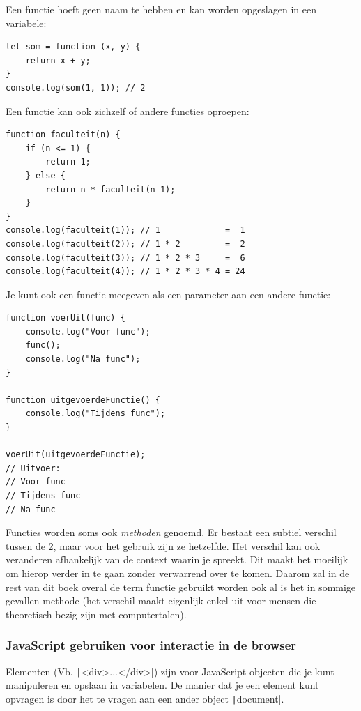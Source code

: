 Een functie hoeft geen naam te hebben en kan worden opgeslagen in een variabele:
\begin{verbatim}
let som = function (x, y) {
    return x + y;
}
console.log(som(1, 1)); // 2
\end{verbatim}

Een functie kan ook zichzelf of andere functies oproepen:
\begin{verbatim}
function faculteit(n) {
    if (n <= 1) {
        return 1;
    } else {
        return n * faculteit(n-1);
    }
}
console.log(faculteit(1)); // 1             =  1
console.log(faculteit(2)); // 1 * 2         =  2
console.log(faculteit(3)); // 1 * 2 * 3     =  6
console.log(faculteit(4)); // 1 * 2 * 3 * 4 = 24
\end{verbatim}

Je kunt ook een functie meegeven als een parameter aan een andere functie:
\begin{verbatim}
function voerUit(func) {
    console.log("Voor func");
    func();
    console.log("Na func");
}

function uitgevoerdeFunctie() {
    console.log("Tijdens func");
}

voerUit(uitgevoerdeFunctie);
// Uitvoer:
// Voor func
// Tijdens func
// Na func
\end{verbatim}

\Opm Functies worden soms ook \emph{methoden} genoemd. Er bestaat een subtiel 
verschil tussen de 2, maar voor het gebruik zijn ze hetzelfde. Het verschil 
kan ook veranderen afhankelijk van de context waarin je spreekt. Dit maakt het
moeilijk om hierop verder in te gaan zonder verwarrend over te komen. Daarom 
zal in de rest van dit boek overal de term functie gebruikt worden ook al is
het in sommige gevallen methode (het verschil maakt eigenlijk enkel uit voor
mensen die theoretisch bezig zijn met computertalen).

\subsubsection{JavaScript gebruiken voor interactie in de browser}%
\label{ssub:JavaScript gebruiken voor interactie in de browser}

Elementen (Vb. \texttt|<div>...</div>|) zijn voor JavaScript objecten
die je kunt manipuleren en opslaan in variabelen. De manier dat je een element 
kunt opvragen is door het te vragen aan een ander object
\texttt|document|.

